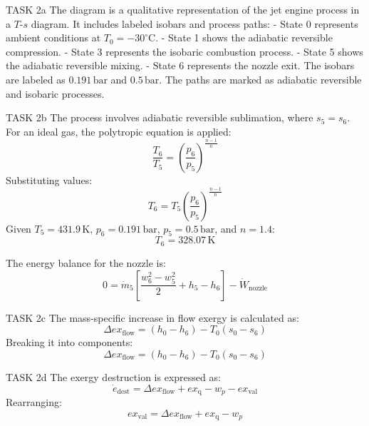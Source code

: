 TASK 2a  
The diagram is a qualitative representation of the jet engine process in a \( T \)-\( s \) diagram. It includes labeled isobars and process paths:  
- State 0 represents ambient conditions at \( T_0 = -30^\circ\text{C} \).  
- State 1 shows the adiabatic reversible compression.  
- State 3 represents the isobaric combustion process.  
- State 5 shows the adiabatic reversible mixing.  
- State 6 represents the nozzle exit.  
The isobars are labeled as \( 0.191 \, \text{bar} \) and \( 0.5 \, \text{bar} \). The paths are marked as adiabatic reversible and isobaric processes.  

TASK 2b  
The process involves adiabatic reversible sublimation, where \( s_5 = s_6 \). For an ideal gas, the polytropic equation is applied:  
\[
\frac{T_6}{T_5} = \left( \frac{p_6}{p_5} \right)^{\frac{n-1}{n}}
\]  
Substituting values:  
\[
T_6 = T_5 \left( \frac{p_6}{p_5} \right)^{\frac{n-1}{n}}
\]  
Given \( T_5 = 431.9 \, \text{K} \), \( p_6 = 0.191 \, \text{bar} \), \( p_5 = 0.5 \, \text{bar} \), and \( n = 1.4 \):  
\[
T_6 = 328.07 \, \text{K}
\]  

The energy balance for the nozzle is:  
\[
0 = \dot{m}_5 \left[ \frac{w_6^2 - w_5^2}{2} + h_5 - h_6 \right] - \dot{W}_{\text{nozzle}}
\]  

TASK 2c  
The mass-specific increase in flow exergy is calculated as:  
\[
\Delta ex_{\text{flow}} = (h_0 - h_6) - T_0 (s_0 - s_6)
\]  
Breaking it into components:  
\[
\Delta ex_{\text{flow}} = (h_0 - h_6) - T_0 (s_0 - s_6)
\]  

TASK 2d  
The exergy destruction is expressed as:  
\[
\dot{e}_{\text{dest}} = \Delta ex_{\text{flow}} + ex_{\text{q}} - w_p - ex_{\text{val}}
\]  
Rearranging:  
\[
ex_{\text{val}} = \Delta ex_{\text{flow}} + ex_{\text{q}} - w_p
\]